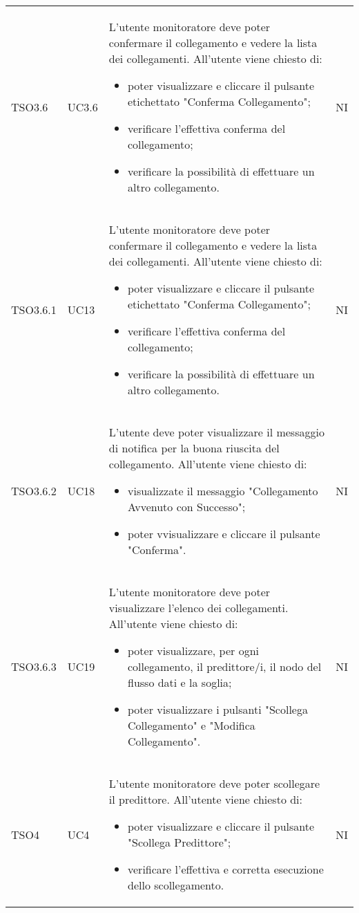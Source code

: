 \begin{longtable}{C{2.5cm} C{2.5cm} L{8cm} C{2cm}}
TSO3.6 &
UC3.6 &
L'utente monitoratore deve poter confermare il collegamento e vedere la lista dei collegamenti. All'utente viene chiesto di:
\begin{itemize}
	\item poter visualizzare e cliccare il pulsante etichettato "Conferma Collegamento";
	\item verificare l'effettiva conferma del collegamento;
	\item verificare la possibilità di effettuare un altro collegamento.
\end{itemize}&
NI \\

TSO3.6.1 &
UC13 &
L'utente monitoratore deve poter confermare il collegamento e vedere la lista dei collegamenti. All'utente viene chiesto di:
\begin{itemize}
	\item poter visualizzare e cliccare il pulsante etichettato "Conferma Collegamento";
	\item verificare l'effettiva conferma del collegamento;
	\item verificare la possibilità di effettuare un altro collegamento.
\end{itemize}&
NI \\
TSO3.6.2 &
UC18 &
L'utente deve poter visualizzare il messaggio di notifica per la buona riuscita del collegamento. All'utente viene chiesto di:
\begin{itemize}
	\item visualizzate il messaggio "Collegamento Avvenuto con Successo";
	\item poter vvisualizzare e cliccare il pulsante "Conferma".
\end{itemize} &
NI \\

TSO3.6.3 &
UC19 &
L'utente monitoratore deve poter visualizzare l'elenco dei collegamenti. All'utente viene chiesto di:
\begin{itemize}
	\item poter visualizzare, per ogni collegamento, il predittore/i, il nodo del flusso dati e la soglia;
	\item poter visualizzare i pulsanti "Scollega Collegamento" e "Modifica Collegamento".
\end{itemize}&
NI \\


TSO4 &
UC4 &
L'utente monitoratore deve poter scollegare il predittore. All'utente viene chiesto di:
\begin{itemize}
	\item poter visualizzare e cliccare il pulsante "Scollega Predittore";
	\item verificare l'effettiva e corretta esecuzione dello scollegamento.
\end{itemize}&
NI \\



\end{longtable}
